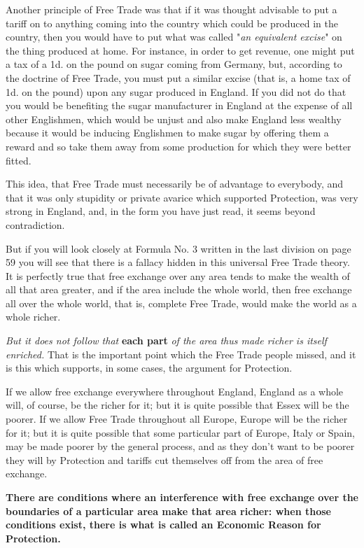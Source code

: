 \documentclass{book}
\begin{document}
Another principle of Free Trade was that if it was thought advisable to put a tariff on to anything coming into the country which could be produced in the country, then you would have to put what was called "\emph{an equivalent excise}" on the thing produced at home. For instance, in order to get revenue, one might put a tax of a 1d. on the pound on sugar coming from Germany, but, according to the doctrine of Free Trade, you must put a similar excise (that is, a home tax of 1d. on the pound) upon any sugar produced in England. If you did not do that you would be benefiting the sugar manufacturer in England at the expense of all other Englishmen, which would be unjust and also make England less wealthy because it would be inducing Englishmen to make sugar by offering them a reward and so take them away from some production for which they were better fitted.

This idea, that Free Trade must necessarily be of advantage to everybody, and that it was only stupidity or private avarice which supported Protection, was very strong in England, and, in the form you have just read, it seems beyond contradiction.

But if you will look closely at Formula No. 3 written in the last division on page 59 you will see that there is a fallacy hidden in this universal Free Trade theory. It is perfectly true that free exchange over any area tends to make the wealth of all that area greater, and if the area include the whole world, then free exchange all over the whole world, that is, complete Free Trade, would make the world as a whole richer.

\emph{But it does not follow that} \textbf{each part} \emph{of the area thus made richer is itself enriched.} That is the important point which the Free Trade people missed, and it is this which supports, in some cases, the argument for Protection.

If we allow free exchange everywhere throughout England, England as a whole will, of course, be the richer for it; but it is quite possible that Essex will be the poorer. If we allow Free Trade throughout all Europe, Europe will be the richer for it; but it is quite possible that some particular part of Europe, Italy or Spain, may be made poorer by the general process, and as they don’t want to be poorer they will by Protection and tariffs cut themselves off from the area of free exchange.

\textbf{There are conditions where an interference with free exchange over the boundaries of a particular area make that area richer: when those conditions exist, there is what is called an Economic Reason for Protection.}
\end{document}
